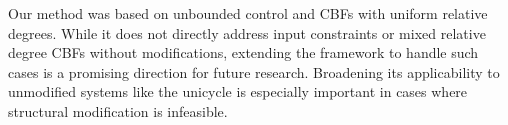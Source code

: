 \documentclass[letterpaper, 10 pt, conference]{ieeeconf}
\newcommand{\TODO}[1]{{\color{black}#1}}
\begin{document}
\TODO{Our method was based on unbounded control and CBFs with uniform relative degrees. While it does not directly address input constraints or mixed relative degree CBFs without modifications, extending the framework to handle such cases is a promising direction for future research. Broadening its applicability to unmodified systems like the unicycle is especially important in cases where structural modification is infeasible.}


\end{document}
